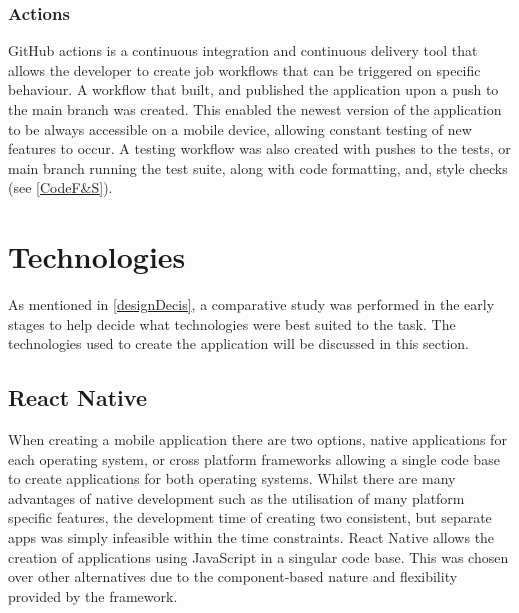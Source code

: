 \subsubsection{Actions}\label{ghActions}
GitHub actions is a continuous integration and continuous delivery tool that allows the developer to create job workflows that can be triggered on specific behaviour. A workflow that built, and published the application upon a push to the main branch was created. This enabled the newest version of the application to be always accessible on a mobile device, allowing constant testing of new features to occur. A testing workflow was also created with pushes to the tests, or main branch running the test suite, along with code formatting, and, style checks (see \ref{CodeF&S}).
\section{Technologies}
As mentioned in \ref{designDecis}, a comparative study \cite{compStudy} was performed in the early stages to help decide what technologies were best suited to the task. The technologies used to create the application will be discussed in this section.
\subsection{React Native}\label{reactSection}
When creating a mobile application there are two options, native applications for each operating system, or cross platform frameworks allowing a single code base to create applications for both operating systems. Whilst there are many advantages of native development such as the utilisation of many platform specific features, the development time of creating two consistent, but separate apps was simply infeasible within the time constraints. React Native \cite{reactnative} allows the creation of applications using JavaScript \cite{js} in a singular code base. This was chosen over other alternatives due to the component-based nature and flexibility provided by the framework.
